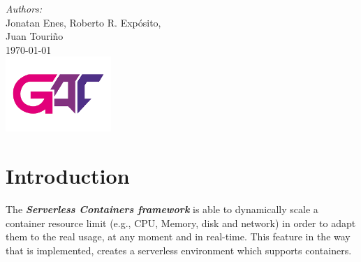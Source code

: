 \documentclass[12pt]{article}
\begin{document}
\begin{titlepage}
		\vspace{-1cm}
		
		\Large \emph{Authors:}\\
		Jonatan Enes, Roberto R. Expósito, \\ Juan Touriño \\[1cm] %
		
		
		{\large \today}\\[1cm] %
		
		
		\includegraphics[width=0.3\textwidth]{gac_logo.png}\\[1cm] %
		
		
		\vfill %
		
	\end{titlepage}



\newcommand{\code}[1]{\colorbox{codegray}{\texttt{\footnotesize #1}}}

\section{Introduction}
\label{sec:UseCase}

The \textit{\textbf{Serverless Containers framework}} is able to dynamically scale a container resource limit (e.g., CPU, Memory, disk and network) in order to adapt them to the real usage, at any moment and in real-time. This feature in the way that is implemented, creates a serverless environment which supports containers.
\end{document}
